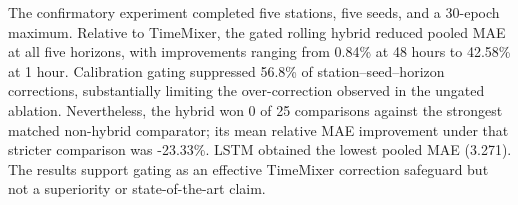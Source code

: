 The confirmatory experiment completed five stations, five seeds, and a
30-epoch maximum. Relative to TimeMixer, the gated rolling hybrid reduced
pooled MAE at all five horizons, with improvements ranging from 0.84\% at 48
hours to 42.58\% at 1 hour. Calibration gating suppressed 56.8\% of
station--seed--horizon corrections, substantially limiting the
over-correction observed in the ungated ablation. Nevertheless, the hybrid
won 0 of 25 comparisons against the strongest matched non-hybrid comparator;
its mean relative MAE improvement under that stricter comparison was
-23.33\%. LSTM obtained the lowest pooled MAE (3.271). The results support
gating as an effective TimeMixer correction safeguard but not a superiority
or state-of-the-art claim.
